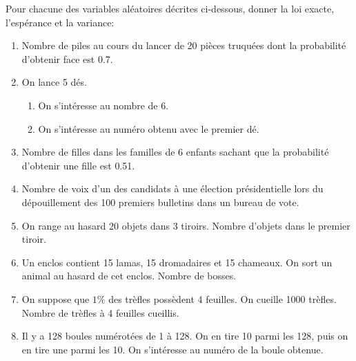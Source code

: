 \documentclass[a4paper, 11pt,reqno]{article}
\begin{document}
\begin{exercice}  \;
	Pour chacune des variables al\'eatoires d\'ecrites ci-dessous, donner la loi exacte, l'esp\'erance et la variance:
	\begin{enumerate}
		\item Nombre de piles au cours du lancer de 20 pi\`eces truqu\'ees dont la probabilit\'e d'obtenir face est 0.7.
		\item On lance 5 d\'es.
		      \begin{enumerate}
			      \item On s'int\'eresse au nombre de 6.
			      \item On s'int\'eresse au num\'ero obtenu avec le premier d\'e.
		      \end{enumerate}
		\item Nombre de filles dans les familles de 6 enfants sachant que la probabilit\'e d'obtenir une fille est 0.51.
		\item Nombre de voix d'un des candidats \`a une \'election pr\'esidentielle lors du d\'epouillement des 100 premiers bulletins dans un bureau de vote.
		\item On range au hasard 20 objets dans 3 tiroirs. Nombre d'objets dans le premier tiroir.
		\item Un enclos contient 15 lamas, 15 dromadaires et 15 chameaux. On sort un animal au hasard de cet enclos. Nombre de bosses.
		\item On suppose que $1\%$ des tr\`efles poss\`edent 4 feuilles. On cueille 1000 tr\`efles. Nombre de tr\`efles \`a 4 feuilles cueillis.
		\item Il y a 128 boules num\'erot\'ees de 1 \`a 128. On en tire 10 parmi les 128, puis on en tire une parmi les 10. On s'int\'eresse au num\'ero de la boule obtenue.
	\end{enumerate}
\end{exercice}
\end{document}
